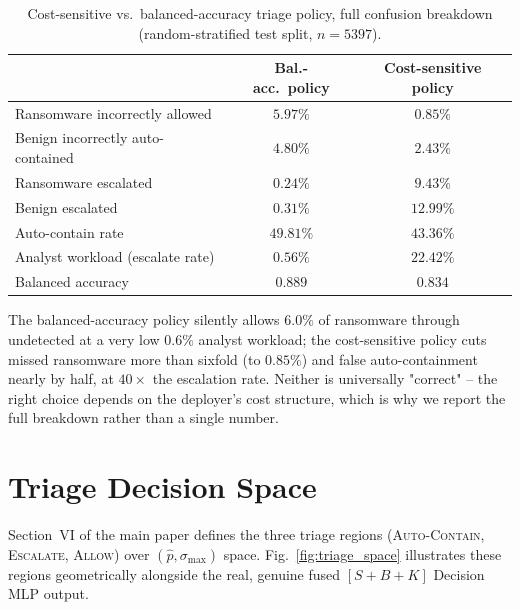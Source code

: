 \documentclass[journal]{IEEEtran}
\begin{document}
\begin{table}[h]
\centering
\footnotesize
\caption{Cost-sensitive vs.\ balanced-accuracy triage policy, full
  confusion breakdown (random-stratified test split, $n{=}5397$).}
\label{tab:cost_sensitive}
\setlength{\tabcolsep}{3pt}
\begin{tabular}{lcc}
\toprule
 & Bal.-acc.\ policy & Cost-sensitive policy \\
\midrule
Ransomware incorrectly allowed   & $5.97\%$ & $\mathbf{0.85\%}$ \\
Benign incorrectly auto-contained & $4.80\%$ & $\mathbf{2.43\%}$ \\
Ransomware escalated             & $0.24\%$ & $9.43\%$ \\
Benign escalated                 & $0.31\%$ & $12.99\%$ \\
Auto-contain rate                & $49.81\%$ & $43.36\%$ \\
Analyst workload (escalate rate) & $\mathbf{0.56\%}$ & $22.42\%$ \\
Balanced accuracy                & $\mathbf{0.889}$ & $0.834$ \\
\bottomrule
\end{tabular}
\end{table}

The balanced-accuracy policy silently allows $6.0\%$ of ransomware through
undetected at a very low $0.6\%$ analyst workload; the cost-sensitive
policy cuts missed ransomware more than sixfold (to $0.85\%$) and false
auto-containment nearly by half, at $40\times$ the escalation rate.
Neither is universally "correct" -- the right choice depends on the
deployer's cost structure, which is why we report the full breakdown
rather than a single number.

\section{Triage Decision Space}\label{sec:supp_triage_space}

Section~VI of the main paper defines the three triage regions
(\textsc{Auto-Contain}, \textsc{Escalate}, \textsc{Allow}) over
$(\hat{p}, \sigma_{\max})$ space. Fig.~\ref{fig:triage_space} illustrates
these regions geometrically alongside the real, genuine fused
$[S{+}B{+}K]$ Decision MLP output.
\end{document}
